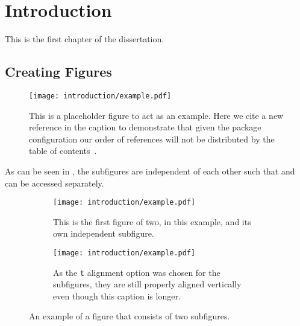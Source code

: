 \chapter{Introduction}\label{chapter:introduction}

This is the first chapter of the dissertation.~\cite{PERF-2007-01}

\section{Creating Figures}\label{sec:figures}
\begin{figure}[htpb]
 \centering
 \texttt{[image: introduction/example.pdf]}
 \caption[Example placeholder figure with a citation~\cite{Higgs:1964ia} and shorter List of Figures caption.
  The List of Figures is protected from first use of glossary entries or acronyms like LHC.]{%
  This is a placeholder figure to act as an example.
  Here we cite a new reference in the caption to demonstrate that given the package configuration our order of references will not be distributed by the table of contents~\cite{Higgs:1964ia}.}\label{fig:test_figure}
\end{figure}

As can be seen in , the subfigures are independent of each other such that  and  can be accessed separately.

\begin{figure}[htbp]
 \centering
 \begin{subfigure}[t]{0.48\textwidth}
  \centering
  \texttt{[image: introduction/example.pdf]}
  \caption[Short List of Figures captions work with subfigures too.]{%
   This is the first figure of two, in this example, and its own independent subfigure.}
  \label{fig:subfigure_1}
 \end{subfigure}%
 \quad
 \begin{subfigure}[t]{0.48\textwidth}
  \centering
  \texttt{[image: introduction/example.pdf]}
  \caption[Which makes the List of Figures readable and actually helpful.]{%
   As the \texttt{t} alignment option was chosen for the subfigures, they are still properly aligned vertically even though this caption is longer.}
  \label{fig:subfigure_2}
 \end{subfigure}
 \caption{An example of a figure that consists of two subfigures.}
 \label{fig:subfigure_example}
\end{figure}

